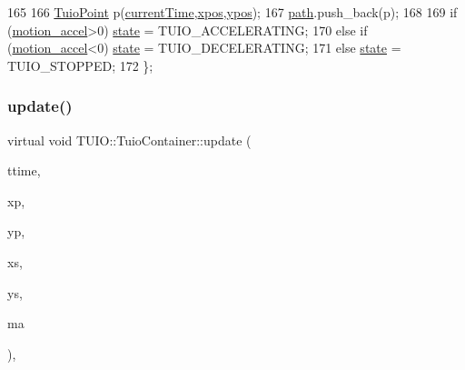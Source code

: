 \begin{DoxyCode}
165             
166             \hyperlink{class_t_u_i_o_1_1_tuio_point_a8611528cf41b797c51d6a9bf324157a5}{TuioPoint} p(\hyperlink{class_t_u_i_o_1_1_tuio_point_ad04658d52ab78e3e0ddc21584ceaa2ff}{currentTime},\hyperlink{class_t_u_i_o_1_1_tuio_point_a0021f8dfddd05f2a17e713a94f5457e6}{xpos},\hyperlink{class_t_u_i_o_1_1_tuio_point_a89a038775a681166168735dbc95c7779}{ypos});
167             \hyperlink{class_t_u_i_o_1_1_tuio_container_a4bdb8935091e0736b6c19ce9fd676b9a}{path}.push\_back(p);
168             
169             \textcolor{keywordflow}{if} (\hyperlink{class_t_u_i_o_1_1_tuio_container_adaa20f12158aee41f7502da330f2a97e}{motion\_accel}>0) \hyperlink{class_t_u_i_o_1_1_tuio_container_a61cfc66997d3d2f2a503e20bd29ddbf1}{state} = TUIO\_ACCELERATING;
170             \textcolor{keywordflow}{else} \textcolor{keywordflow}{if} (\hyperlink{class_t_u_i_o_1_1_tuio_container_adaa20f12158aee41f7502da330f2a97e}{motion\_accel}<0) \hyperlink{class_t_u_i_o_1_1_tuio_container_a61cfc66997d3d2f2a503e20bd29ddbf1}{state} = TUIO\_DECELERATING;
171             \textcolor{keywordflow}{else} \hyperlink{class_t_u_i_o_1_1_tuio_container_a61cfc66997d3d2f2a503e20bd29ddbf1}{state} = TUIO\_STOPPED;
172         \};
\end{DoxyCode}
\mbox{\label{class_t_u_i_o_1_1_tuio_container_a5ce41488a3ad8ea6c333a0acdeb69f9a}} 
\subsubsection{\texorpdfstring{update()}{update()}\hspace{0.1cm}{\footnotesize\ttfamily [2/4]}}
{\footnotesize\ttfamily virtual void T\+U\+I\+O\+::\+Tuio\+Container\+::update (\begin{DoxyParamCaption}\item[{\hyperlink{class_t_u_i_o_1_1_tuio_time}{Tuio\+Time}}]{ttime,  }\item[{float}]{xp,  }\item[{float}]{yp,  }\item[{float}]{xs,  }\item[{float}]{ys,  }\item[{float}]{ma }\end{DoxyParamCaption})\hspace{0.3cm}{\ttfamily [inline]}, {\ttfamily [virtual]}}

